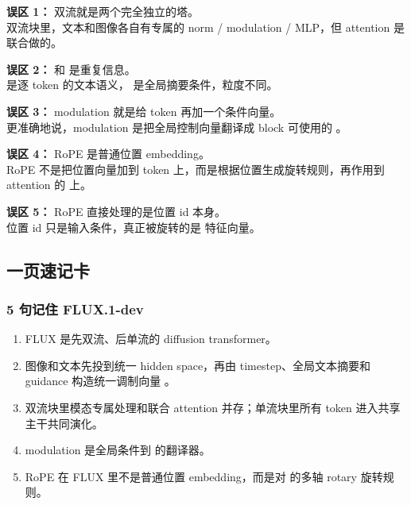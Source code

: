 \begin{warnbox}
\textbf{误区 1：} 双流就是两个完全独立的塔。\\
 双流块里，文本和图像各自有专属的 norm / modulation / MLP，但 attention 是联合做的。
\end{warnbox}

\begin{warnbox}
\textbf{误区 2：}  和  是重复信息。\\
  是逐 token 的文本语义， 是全局摘要条件，粒度不同。
\end{warnbox}

\begin{warnbox}
\textbf{误区 3：} modulation 就是给 token 再加一个条件向量。\\
 更准确地说，modulation 是把全局控制向量翻译成 block 可使用的 。
\end{warnbox}

\begin{warnbox}
\textbf{误区 4：} RoPE 是普通位置 embedding。\\
 RoPE 不是把位置向量加到 token 上，而是根据位置生成旋转规则，再作用到 attention 的  上。
\end{warnbox}

\begin{warnbox}
\textbf{误区 5：} RoPE 直接处理的是位置 id 本身。\\
 位置 id 只是输入条件，真正被旋转的是  特征向量。
\end{warnbox}

\subsection{一页速记卡}

\subsubsection{5 句记住 FLUX.1-dev}

\begin{enumerate}[leftmargin=1.5em]
  \item FLUX 是先双流、后单流的 diffusion transformer。
  \item 图像和文本先投到统一 hidden space，再由 timestep、全局文本摘要和 guidance 构造统一调制向量 。
  \item 双流块里模态专属处理和联合 attention 并存；单流块里所有 token 进入共享主干共同演化。
  \item modulation 是全局条件到  的翻译器。
  \item RoPE 在 FLUX 里不是普通位置 embedding，而是对  的多轴 rotary 旋转规则。
\end{enumerate}

